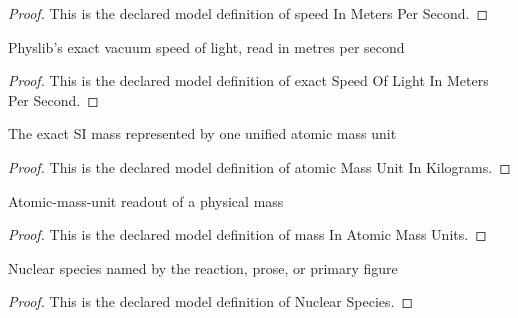 \begin{proof}
  This is the declared model definition of speed In Meters Per Second.
\end{proof}
\begin{definition}
  \label{def:physics:phyx-mini-0573:phyxminiproblems-problemphyxmini0573-exactspeedoflightinmeterspersecond}
  Physlib's exact vacuum speed of light, read in metres per second
\end{definition}
\begin{proof}
  This is the declared model definition of exact Speed Of Light In Meters Per Second.
\end{proof}
\begin{definition}
  \label{def:physics:phyx-mini-0573:phyxminiproblems-problemphyxmini0573-atomicmassunitinkilograms}
  The exact SI mass represented by one unified atomic mass unit
\end{definition}
\begin{proof}
  This is the declared model definition of atomic Mass Unit In Kilograms.
\end{proof}
\begin{definition}
  \label{def:physics:phyx-mini-0573:phyxminiproblems-problemphyxmini0573-massinatomicmassunits}
  Atomic-mass-unit readout of a physical mass
\end{definition}
\begin{proof}
  This is the declared model definition of mass In Atomic Mass Units.
\end{proof}
\begin{definition}
  \label{def:physics:phyx-mini-0573:phyxminiproblems-problemphyxmini0573-nuclearspecies}
  Nuclear species named by the reaction, prose, or primary figure
\end{definition}
\begin{proof}
  This is the declared model definition of Nuclear Species.
\end{proof}
